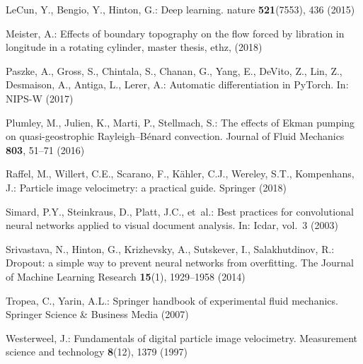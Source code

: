 \documentclass{svjour3}                     %
\begin{document}
\begin{thebibliography}{17}
LeCun, Y., Bengio, Y., Hinton, G.: Deep learning.
\newblock nature \textbf{521}(7553), 436 (2015)

Meister, A.: Effects of boundary topography on the flow forced by libration in
  longitude in a rotating cylinder, master thesis, ethz, (2018)

Paszke, A., Gross, S., Chintala, S., Chanan, G., Yang, E., DeVito, Z., Lin, Z.,
  Desmaison, A., Antiga, L., Lerer, A.: Automatic differentiation in
  {P}y{T}orch.
\newblock In: NIPS-W (2017)

Plumley, M., Julien, K., Marti, P., Stellmach, S.: The effects of {E}kman
  pumping on quasi-geostrophic {R}ayleigh--{B}{\'e}nard convection.
\newblock Journal of Fluid Mechanics \textbf{803}, 51--71 (2016)

Raffel, M., Willert, C.E., Scarano, F., K{\"a}hler, C.J., Wereley, S.T.,
  Kompenhans, J.: Particle image velocimetry: a practical guide.
\newblock Springer (2018)

Simard, P.Y., Steinkraus, D., Platt, J.C., et~al.: Best practices for
  convolutional neural networks applied to visual document analysis.
\newblock In: Icdar, vol.~3 (2003)

Srivastava, N., Hinton, G., Krizhevsky, A., Sutskever, I., Salakhutdinov, R.:
  Dropout: a simple way to prevent neural networks from overfitting.
\newblock The Journal of Machine Learning Research \textbf{15}(1), 1929--1958
  (2014)

Tropea, C., Yarin, A.L.: Springer handbook of experimental fluid mechanics.
\newblock Springer Science \& Business Media (2007)

Westerweel, J.: Fundamentals of digital particle image velocimetry.
\newblock Measurement science and technology \textbf{8}(12), 1379 (1997)

\end{thebibliography}
\end{document}
